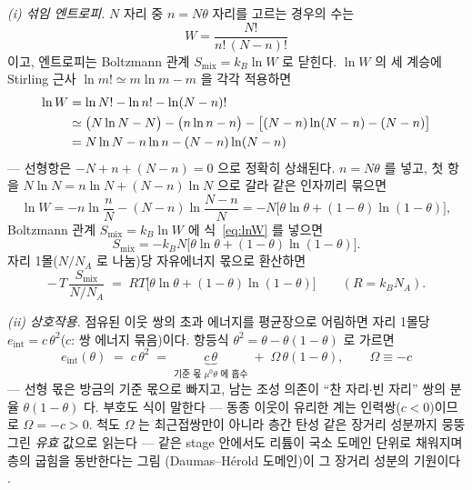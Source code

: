 \documentclass[11pt,a4paper]{article}
\begin{document}
\emph{(i) 섞임 엔트로피.} $N$ 자리 중 $n=N\theta$ 자리를 고르는 경우의 수는
\begin{equation}
W=\frac{N!}{n!\,(N-n)!}
\label{eq:W}
\end{equation}
이고, 엔트로피는 Boltzmann 관계 $S_{\mathrm{mix}}=k_B\ln W$ 로 닫힌다. $\ln W$ 의 세 계승에
Stirling 근사 $\ln m!\simeq m\ln m-m$ 을 각각 적용하면
\begin{align}
\ln W&=\ln N!-\ln n!-\ln(N-n)!\notag\\
&\simeq\big(N\ln N-N\big)-\big(n\ln n-n\big)-\big[(N-n)\ln(N-n)-(N-n)\big]
\label{eq:stirlingexp}\\
&=N\ln N-n\ln n-(N-n)\ln(N-n)\notag
\end{align}
— 선형항은 $-N+n+(N-n)=0$ 으로 정확히 상쇄된다. $n=N\theta$ 를 넣고, 첫 항을
$N\ln N=n\ln N+(N-n)\ln N$ 으로 갈라 같은 인자끼리 묶으면
\begin{equation}
\ln W=-n\ln\frac{n}{N}-(N-n)\ln\frac{N-n}{N}
=-N\big[\theta\ln\theta+(1-\theta)\ln(1-\theta)\big],
\label{eq:lnW}
\end{equation}
Boltzmann 관계 $S_{\mathrm{mix}}=k_B\ln W$ 에 식~\eqref{eq:lnW} 를 넣으면
\begin{equation}
S_{\mathrm{mix}}=-k_BN\big[\theta\ln\theta+(1-\theta)\ln(1-\theta)\big].
\label{eq:smix}
\end{equation}
자리 1몰($N/N_A$ 로 나눔)당 자유에너지 몫으로 환산하면
\begin{equation}
-\,T\,\frac{S_{\mathrm{mix}}}{N/N_A}
\;=\;RT\big[\theta\ln\theta+(1-\theta)\ln(1-\theta)\big]
\qquad(R=k_BN_A).
\label{eq:smixmol}
\end{equation}

\emph{(ii) 상호작용.} 점유된 이웃 쌍의 초과 에너지를 평균장으로 어림하면 자리 1몰당
$e_{\mathrm{int}}=c\,\theta^2$($c$: 쌍 에너지 묶음)이다. 항등식 $\theta^2=\theta-\theta(1-\theta)$
로 가르면
\begin{equation}
e_{\mathrm{int}}(\theta)\;=\;c\,\theta^{2}
\;=\;\underbrace{c\,\theta}_{\text{기준 몫 }\mu^0\theta\text{ 에 흡수}}\;+\;\Omega\,\theta(1-\theta),
\qquad\Omega\equiv-c
\label{eq:meanfield}
\end{equation}
— 선형 몫은 방금의 기준 몫으로 빠지고, 남는 조성 의존이 ``찬 자리$\cdot$빈 자리'' 쌍의 분율
$\theta(1-\theta)$ 다. 부호도 식이 말한다 — 동종 이웃이 유리한 계는 인력쌍($c<0$)이므로
$\Omega=-c>0$. 척도 $\Omega$ 는 최근접쌍만이 아니라 층간 탄성 같은 장거리 성분까지 뭉뚱그린 \emph{유효} 값으로
읽는다 — 같은 stage 안에서도 리튬이 국소 도메인 단위로 채워지며 층의 굽힘을 동반한다는 그림
(Daumas--H\'erold 도메인)이 그 장거리 성분의 기원이다 \cite{mckinnon1983}.
\end{document}
